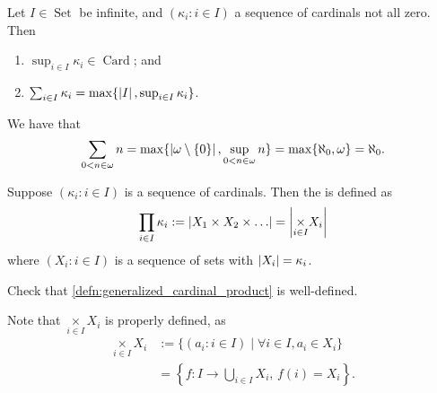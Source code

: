 \documentclass[notoc,notitlepage]{tufte-book}
\DeclareMathOperator{\Card}{Card }
\DeclareMathOperator{\Set}{Set }
\begin{document}
\begin{thm}\label{thm:properties_of_cardinal_sum}
  Let $I \in \Set$ be infinite, and $(\kappa_i : i \in I)$ a sequence of cardinals not all zero. Then
  \begin{enumerate}
    \item $\sup_{i \in I} \kappa_i \in \Card$; and
    \item $\sum_{i \in I} \kappa_i = \max \{ \left|I\right|, \sup_{i \in I} \kappa_i \}$.
  \end{enumerate}
\end{thm}

\begin{eg}
  We have that
  \begin{equation*}
    \sum_{0 < n \in \omega} n = \max \{ \left|\omega \setminus \{0\}\right|, \sup_{0 < n \in \omega} n \} = \max \{ \aleph_0, \omega \} = \aleph_0.
  \end{equation*}
\end{eg}

\begin{defn}\label{defn:generalized_cardinal_product}
  Suppose $(\kappa_i : i \in I)$ is a sequence of cardinals. Then the  is defined as
  \begin{equation*}
    \prod_{i \in I} \kappa_i := \left| X_1 \times X_2 \times \ldots \right| = \left| \underset{i \in I}{\times} X_i \right|
  \end{equation*}
  where $(X_i : i \in I)$ is a sequence of sets with $\left|X_i\right| = \kappa_i$.
\end{defn}

\begin{ex}
  Check that \cref{defn:generalized_cardinal_product} is well-defined.
\end{ex}

\begin{note}
  Note that $\underset{i \in I}{\times} X_i$ is properly defined, as
  \begin{align*}
    \underset{i \in I}{\times} X_i &:= \{ (a_i : i \in I) \mid \forall i \in I, a_i \in X_i \} \\
                                    &= \left\{ f : I \to \bigcup_{i \in I} X_i, \, f(i) = X_i \right\}.
  \end{align*}
\end{note}
\end{document}
